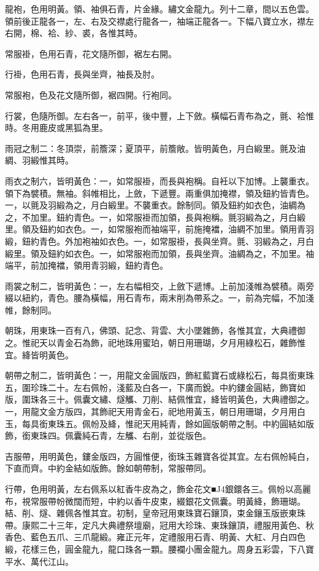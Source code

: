 \begin{pinyinscope}
龍袍，色用明黃。領、袖俱石青，片金緣。繡文金龍九。列十二章，間以五色雲。領前後正龍各一，左、右及交襟處行龍各一，袖端正龍各一。下幅八寶立水，襟左右開，棉、袷、紗、裘，各惟其時。

常服褂，色用石青，花文隨所御，裾左右開。

行褂，色用石青，長與坐齊，袖長及肘。

常服袍，色及花文隨所御，裾四開。行袍同。

行裳，色隨所御。左右各一，前平，後中豐，上下斂。橫幅石青布為之，氈、袷惟時。冬用鹿皮或黑狐為里。

雨冠之制二：冬頂崇，前簷深；夏頂平，前簷敞。皆明黃色，月白緞里。氈及油綢、羽緞惟其時。

雨衣之制六，皆明黃色：一，如常服褂，而長與袍稱。自衽以下加博。上襲重衣。領下為襞積。無袖。斜帷相比，上斂，下遞豐。兩重俱加掩襟，領及鈕約皆青色。一，以氈及羽緞為之，月白緞里。不襲重衣。餘制同。領及鈕約如衣色，油綢為之，不加里。鈕約青色。一，如常服褂而加領，長與袍稱。氈羽緞為之，月白緞里。領及鈕約如衣色。一，如常服袍而袖端平，前施掩襠，油綢不加里。領用青羽緞，鈕約青色。外加袍袖如衣色。一，如常服褂，長與坐齊。氈、羽緞為之，月白緞里。領及鈕約如衣色。一，如常服袍而加領，長與坐齊。油綢為之，不加里。袖端平，前加掩襠，領用青羽緞，鈕約青色。

雨裳之制二，皆明黃色：一，左右幅相交，上斂下遞博。上前加淺帷為襞積。兩旁綴以紐約，青色。腰為橫幅，用石青布，兩末削為帶系之。一，前為完幅，不加淺帷，餘制同。

朝珠，用東珠一百有八，佛頭、記念、背雲、大小墜雜飾，各惟其宜，大典禮御之。惟祀天以青金石為飾，祀地珠用蜜珀，朝日用珊瑚，夕月用綠松石，雜飾惟宜。絳皆明黃色。

朝帶之制二，皆明黃色：一，用龍文金圓版四，飾紅藍寶石或綠松石，每具銜東珠五，圍珍珠二十。左右佩帉，淺藍及白各一，下廣而銳。中約鏤金圓結，飾寶如版，圍珠各三十。佩囊文繡、燧觿、刀削、結佩惟宜，絳皆明黃色，大典禮御之。一，用龍文金方版四，其飾祀天用青金石，祀地用黃玉，朝日用珊瑚，夕月用白玉，每具銜東珠五。佩帉及絳，惟祀天用純青，餘如圓版朝帶之制。中約圓結如版飾，銜東珠四。佩囊純石青，左觿、右削，並從版色。

吉服帶，用明黃色，鏤金版四，方圓惟便，銜珠玉雜寶各從其宜。左右佩帉純白，下直而齊。中約金結如版飾。餘如朝帶制，常服帶同。

行帶，色用明黃，左右佩系以紅香牛皮為之，飾金花文■J4銀鐶各三。佩帉以高麗布，視常服帶帉微闊而短，中約以香牛皮束，綴銀花文佩囊。明黃絳，飾珊瑚。結、削、燧、雜佩各惟其宜。初制，皇帝冠用東珠寶石鑲頂，束金鑲玉版嵌東珠帶。康熙二十三年，定凡大典禮祭壇廟，冠用大珍珠、東珠鑲頂，禮服用黃色、秋香色、藍色五爪、三爪龍緞。雍正元年，定禮服用石青、明黃、大紅、月白四色緞，花樣三色，圓金龍九，龍口珠各一顆。腰襴小團金龍九。周身五彩雲，下八寶平水、萬代江山。


\end{pinyinscope}
